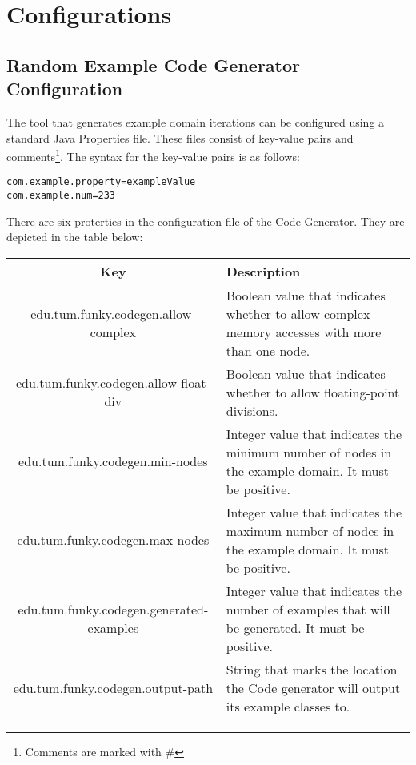 
\chapter{Configurations}
\section{Random Example Code Generator Configuration}
\label{sect:appendix_config_random}
The tool that generates example domain iterations can be configured using a standard Java Properties file. These files consist of key-value pairs and comments\footnote{Comments are marked with \#}. The syntax for the key-value pairs is as follows:

\begin{verbatim}
com.example.property=exampleValue
com.example.num=233 
\end{verbatim}

There are six proterties in the configuration file of the Code Generator. They are depicted in the table below: \\

\begin{tabular}{c p{6cm}}
\hline
\textbf{Key} & \textbf{Description}\\
\hline
\hline
edu.tum.funky.codegen.allow-complex & Boolean value that indicates whether to allow complex memory accesses with more than one node. \\
\hline
edu.tum.funky.codegen.allow-float-div & Boolean value that indicates whether to allow floating-point divisions. \\
\hline
edu.tum.funky.codegen.min-nodes & Integer value that indicates the minimum number of nodes in the example domain. It must be positive. \\
\hline
edu.tum.funky.codegen.max-nodes & Integer value that indicates the maximum number of nodes in the example domain. It must be positive. \\
\hline
edu.tum.funky.codegen.generated-examples & Integer value that indicates the number of examples that will be generated. It must be positive. \\
\hline
edu.tum.funky.codegen.output-path & String that marks the location the Code generator will output its example classes to.\\
\hline
\hline
\end{tabular}

\newpage